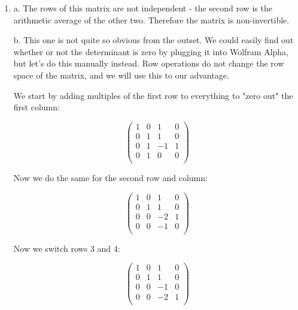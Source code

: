 \documentclass{article}
\newcommand{\chapternumber}{2}
\newenvironment{QandA}{\begin{enumerate}[label=\chapternumber.\arabic*]\bfseries\boldmath}
	{\end{enumerate}}
\newenvironment{answered}{\par\bigskip\normalfont\unboldmath}{}
\begin{document}
\begin{QandA}
\begin{answered}
\[\begin{pmatrix}
				0 & 2 & -3 \\
				0 & 0 & -24 \\
			\end{pmatrix}^{-1}
			\begin{pmatrix}
				1 \\ 0 \\ -6
			\end{pmatrix}
			=
			\frac{1}{8}\cdot
			\begin{pmatrix}
				3 \\ 3 \\ 2
			\end{pmatrix}\]
		\end{answered}
		
		\item
		\begin{answered}
			a. The rows of this matrix are not independent - the second row is the arithmetic average of the other two. Therefore the matrix is non-invertible.
			
			b. This one is not quite so obvious from the outset. We could easily find out whether or not the determinant is zero by plugging it into Wolfram Alpha, but let's do this manually instead. Row operations do not change the row space of the matrix, and we will use this to our advantage.
			
			We start by adding multiples of the first row to everything to "zero out" the first column:
			
			\[\begin{pmatrix}
				1 & 0 & 1 & 0 \\
				0 & 1 & 1 & 0 \\
				0 & 1 & -1 & 1 \\
				0 & 1 & 0 & 0 \\
			\end{pmatrix}
			\]
			
			Now we do the same for the second row and column:
			
			\[\begin{pmatrix}
				1 & 0 & 1 & 0 \\
				0 & 1 & 1 & 0 \\
				0 & 0 & -2 & 1 \\
				0 & 0 & -1 & 0 \\
			\end{pmatrix}
			\]
			
			Now we switch rows 3 and 4:
			
			\[\begin{pmatrix}
				1 & 0 & 1 & 0 \\
				0 & 1 & 1 & 0 \\
				0 & 0 & -1 & 0 \\
				0 & 0 & -2 & 1 \\
			\end{pmatrix}
			\]
			

\end{answered}
\end{QandA}
\end{document}
